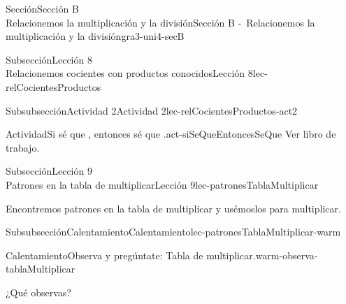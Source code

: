 \begin{sectionptx}{Sección}{{\Large Sección B\\}Relacionemos la multiplicación y la división}{}{Sección B -~Relacionemos la multiplicación y la división}{}{}{gra3-uni4-secB}
\begin{subsectionptx}{Subsección}{{\normalsize Lección 8\\[-0.05cm]}Relacionemos cocientes con productos conocidos}{}{Lección 8}{}{}{lec-relCocientesProductos}
\begin{subsubsectionptx}{Subsubsección}{Actividad 2}{}{Actividad 2}{}{}{lec-relCocientesProductos-act2}
\begin{activity}{Actividad}{Si sé que \textellipsis{}, entonces sé que \textellipsis{}.}{act-siSeQueEntoncesSeQue}%
Ver libro de trabajo.
\end{activity}%
\end{subsubsectionptx}
\end{subsectionptx}
%
%
\typeout{************************************************}
\typeout{************************************************}
%
\clearpage
\begin{subsectionptx}{Subsección}{{\normalsize Lección 9\\[-0.05cm]}Patrones en la tabla de multiplicar}{}{Lección 9}{}{}{lec-patronesTablaMultiplicar}
\begin{introduction}{}%
Encontremos patrones en la tabla de multiplicar y usémoslos para multiplicar.%
\end{introduction}%
%
%
\typeout{************************************************}
\typeout{************************************************}
%
\begin{subsubsectionptx}{Subsubsección}{Calentamiento}{}{Calentamiento}{}{}{lec-patronesTablaMultiplicar-warm}
\begin{exploration}{Calentamiento}{Observa y pregúntate: Tabla de multiplicar.}{warm-observa-tablaMultiplicar}%
\begin{sidebyside}{2}{0}{0}{0.05}%
\begin{sbspanel}{0.3}%
¿Qué observas?\\

\end{sbspanel}
\end{sidebyside}
\end{exploration}
\end{subsubsectionptx}
\end{subsectionptx}
\end{sectionptx}
